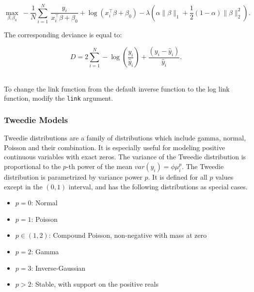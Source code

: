 $$  \max_{\beta,\beta_0} \  - \frac{1}{N}  \sum_{i=1}^N  \ \frac{y_i}{x_i^{\top}\beta+\beta_0 } + \log(x_i^{\top}\beta + \beta_0) -\lambda \left(  \alpha \| \beta \|_1 + \frac{1}{2}(1-\alpha)\| \beta \|_2^2  \right). $$

The corresponding deviance is equal to:

$$D = 2\sum_{i=1}^{N} - \log\left({\frac{ y_i }{\hat{y}_i}}\right) + \frac{(y_i - \hat{y}_i)}{\hat{y}_i}. $$

\waterExampleInR
\\
To change the link function from the default inverse function to the log link function, modify the \texttt{link}
argument.
\bigskip

\newpage
\waterExampleInPython


\subsubsection{Tweedie Models}

Tweedie distributions are a family of distributions which include gamma, normal, Poisson and their combination. It is especially useful for modeling positive continuous variables with exact zeros. The variance of the Tweedie distribution is proportional to the $p$-th power of the mean $var(y_i)=\phi \mu_i^p$. The Tweedie distribution is parametrized by variance power $p$. It is defined for all $p$ values except in the $(0,1)$ interval, and has the following distributions as special cases.

\begin{itemize}
\item  $p=0$: Normal
\item  $p=1$: Poisson
\item $p\in(1, 2)$: Compound Poisson, non-negative with mass at zero
\item $p=2$: Gamma
\item $p=3$: Inverse-Gaussian
\item $p>2$:  Stable, with support on the positive reals %
\end{itemize}

